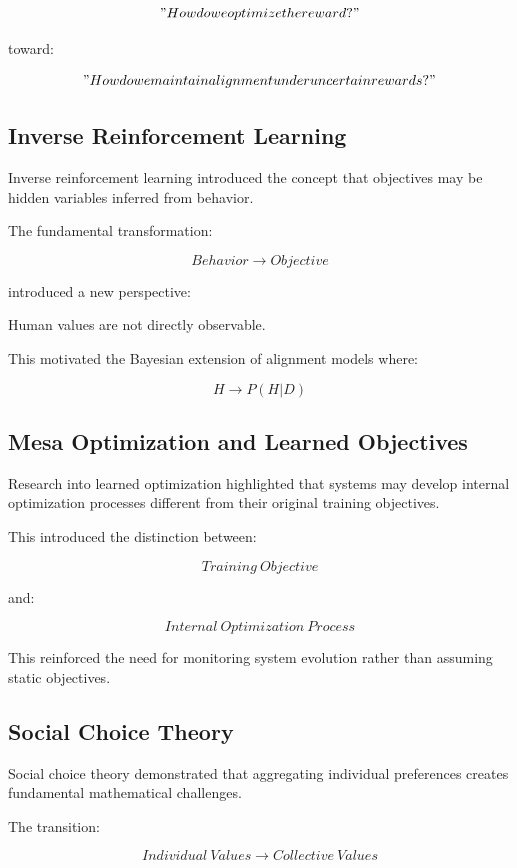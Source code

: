 \documentclass[11pt]{article}
\begin{document}
\[
"How do we optimize the reward?"
\]


toward:


\[
"How do we maintain alignment under uncertain rewards?"
\]



\subsection{Inverse Reinforcement Learning}


Inverse reinforcement learning introduced the concept that objectives
may be hidden variables inferred from behavior.


The fundamental transformation:


\[
Behavior
\rightarrow
Objective
\]


introduced a new perspective:


Human values are not directly observable.


This motivated the Bayesian extension of alignment models where:


\[
H
\rightarrow
P(H|D)
\]



\subsection{Mesa Optimization and Learned Objectives}


Research into learned optimization highlighted that systems may develop
internal optimization processes different from their original training
objectives.


This introduced the distinction between:


\[
Training\ Objective
\]


and:


\[
Internal\ Optimization\ Process
\]


This reinforced the need for monitoring system evolution rather than
assuming static objectives.



\subsection{Social Choice Theory}


Social choice theory demonstrated that aggregating individual
preferences creates fundamental mathematical challenges.


The transition:


\[
Individual\ Values
\rightarrow
Collective\ Values
\]
\end{document}
